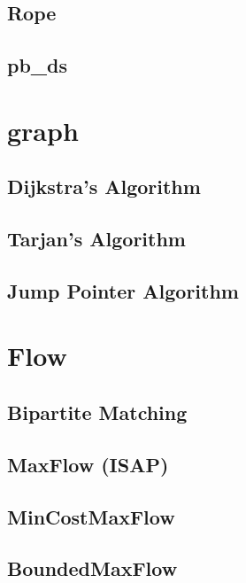 \documentclass[a4paper,10pt,twocolumn,oneside]{article}
\begin{document}
\subsection{Rope}

\subsection{pb\_ds}



\section{graph}
\subsection{Dijkstra's Algorithm}

\subsection{Tarjan's Algorithm}

\subsection{Jump Pointer Algorithm}


\section{Flow}
\subsection{Bipartite Matching}

\subsection{MaxFlow (ISAP)}

\subsection{MinCostMaxFlow}

\subsection{BoundedMaxFlow}

\end{document}
